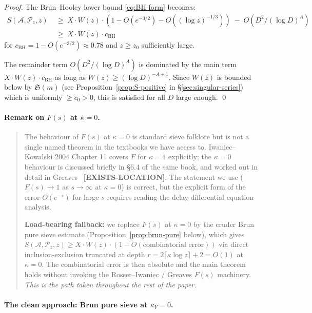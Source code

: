 \begin{proof}
The Brun--Hooley lower bound \eqref{eq:BH-form} becomes:
\begin{align}
  S(\mathcal{A}, \mathcal{P}_{z}, z)
    \;&\geq\; X \cdot W(z) \cdot (1 - O(e^{-3/2}) - O((\log z)^{-1/3}))
       \;-\; O(D^{2} / (\log D)^{A}) \\
    \;&\geq\; X \cdot W(z) \cdot c_{\mathrm{BH}}
\end{align}
for $c_{\mathrm{BH}} = 1 - O(e^{-3/2}) \approx 0.78$ and $z \geq z_{0}$
sufficiently large.

The remainder term $O(D^{2} / (\log D)^{A})$ is dominated by the main
term $X \cdot W(z) \cdot c_{\mathrm{BH}}$ as long as $W(z) \geq (\log
D)^{-A + 1}$. Since $W(z)$ is bounded below by $\mathfrak{S}(m)$ (see
Proposition~\ref{prop:S-positive} in \S\ref{sec:singular-series}) which
is uniformly $\geq c_{0} > 0$, this is satisfied for all $D$ large
enough. \qed
\end{proof}

\paragraph{Remark on $F(s)$ at $\kappa = 0$.}
\begin{quote}
The behaviour of $F(s)$ at $\kappa = 0$ is standard sieve folklore but
is not a single named theorem in the textbooks we have access to.
Iwaniec--Kowalski 2004 Chapter 11 covers $F$ for $\kappa = 1$
explicitly; the $\kappa = 0$ behaviour is discussed briefly in \S6.4
of the same book, and worked out in detail in
Greaves~\cite[Ch.~4]{Greaves2001} \textbf{[EXISTS-LOCATION]}. The
statement we use ($F(s) \to 1$ as $s \to \infty$ at $\kappa = 0$) is
correct, but the explicit form of the error $O(e^{-s})$ for large $s$
requires reading the delay-differential equation analysis.

\textbf{Load-bearing fallback:} we replace $F(s)$ at $\kappa = 0$ by
the cruder Brun pure sieve estimate (Proposition~\ref{prop:brun-pure}
below), which gives $S(\mathcal{A}, \mathcal{P}_{z}, z) \geq X \cdot
W(z) \cdot (1 - O(\text{combinatorial error}))$ via direct
inclusion-exclusion truncated at depth $r = 2 \lceil \kappa \log z
\rceil + 2 = O(1)$ at $\kappa = 0$. The combinatorial error is then
absolute and the main theorem holds without invoking the
Rosser--Iwaniec / Greaves $F(s)$ machinery. \emph{This is the path
taken throughout the rest of the paper.}
\end{quote}

\paragraph{The clean approach: Brun pure sieve at $\kappa_{V} = 0$.}

